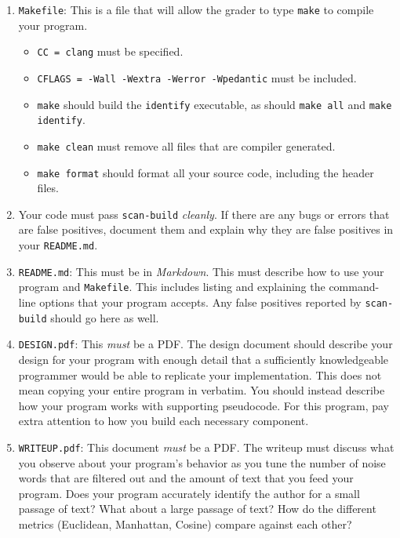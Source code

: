 \begin{enumerate}
  \item \texttt{Makefile}: This is a file that will allow the grader to
    type \texttt{make} to compile your program.

    \begin{itemize}
      \item \texttt{CC = clang} must be specified.
      \item \texttt{CFLAGS = -Wall -Wextra -Werror -Wpedantic}
        must be included.
      \item \texttt{make} should build the \texttt{identify}
        executable, as should \texttt{make all} and \texttt{make
        identify}.
      \item \texttt{make clean} must remove all files that are compiler
        generated.
      \item \texttt{make format} should format all your source code,
        including the header files.
    \end{itemize}

  \item Your code must pass \texttt{scan-build} \emph{cleanly}. If there
    are any bugs or errors that are false positives, document them and
    explain why they are false positives in your \texttt{README.md}.

  \item \texttt{README.md}: This must be in \emph{Markdown}. This must
    describe how to use your program and \texttt{Makefile}. This
    includes listing and explaining the command-line options that your
    program accepts. Any false positives reported by \texttt{scan-build}
    should go here as well.

  \item \texttt{DESIGN.pdf}: This \emph{must} be a PDF. The design
    document should describe your design for your program with enough
    detail that a sufficiently knowledgeable programmer would be able to
    replicate your implementation. This does not mean copying your
    entire program in verbatim. You should instead describe how your
    program works with supporting pseudocode. For this program, pay
    extra attention to how you build each necessary component.

  \item \texttt{WRITEUP.pdf}: This document \emph{must} be a PDF. The
    writeup must discuss what you observe about your program's behavior as you
    tune the number of noise words that are filtered out and the amount of text
    that you feed your program. Does your program accurately identify the author
    for a small passage of text? What about a large passage of text? How do the
    different metrics (Euclidean, Manhattan, Cosine) compare against each other?
\end{enumerate}
